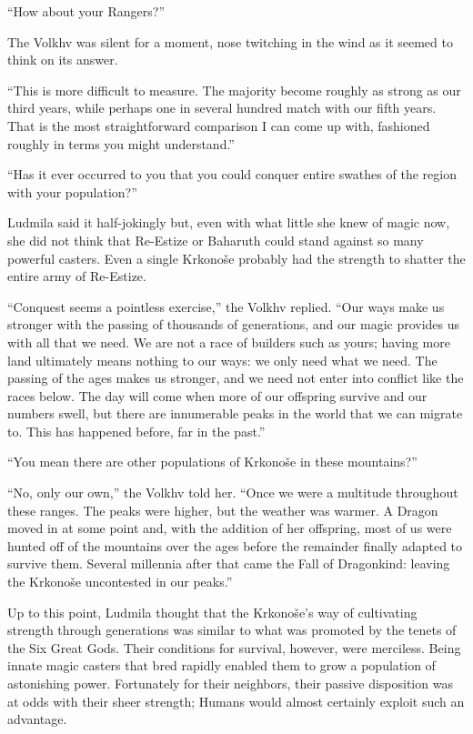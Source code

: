 “How about your Rangers?”

 

The Volkhv was silent for a moment, nose twitching in the wind as it seemed to think on its answer.

 

“This is more difficult to measure. The majority become roughly as strong as our third years, while perhaps one in several hundred match with our fifth years. That is the most straightforward comparison I can come up with, fashioned roughly in terms you might understand.”

 

“Has it ever occurred to you that you could conquer entire swathes of the region with your population?”

 

Ludmila said it half-jokingly but, even with what little she knew of magic now, she did not think that Re-Estize or Baharuth could stand against so many powerful casters. Even a single Krkonoše probably had the strength to shatter the entire army of Re-Estize.

 

“Conquest seems a pointless exercise,” the Volkhv replied. “Our ways make us stronger with the passing of thousands of generations, and our magic provides us with all that we need. We are not a race of builders such as yours; having more land ultimately means nothing to our ways: we only need what we need. The passing of the ages makes us stronger, and we need not enter into conflict like the races below. The day will come when more of our offspring survive and our numbers swell, but there are innumerable peaks in the world that we can migrate to. This has happened before, far in the past.”

 

“You mean there are other populations of Krkonoše in these mountains?”

 

“No, only our own,” the Volkhv told her. “Once we were a multitude throughout these ranges. The peaks were higher, but the weather was warmer. A Dragon moved in at some point and, with the addition of her offspring, most of us were hunted off of the mountains over the ages before the remainder finally adapted to survive them. Several millennia after that came the Fall of Dragonkind: leaving the Krkonoše uncontested in our peaks.”

 

Up to this point, Ludmila thought that the Krkonoše’s way of cultivating strength through generations was similar to what was promoted by the tenets of the Six Great Gods. Their conditions for survival, however, were merciless. Being innate magic casters that bred rapidly enabled them to grow a population of astonishing power. Fortunately for their neighbors, their passive disposition was at odds with their sheer strength; Humans would almost certainly exploit such an advantage.

